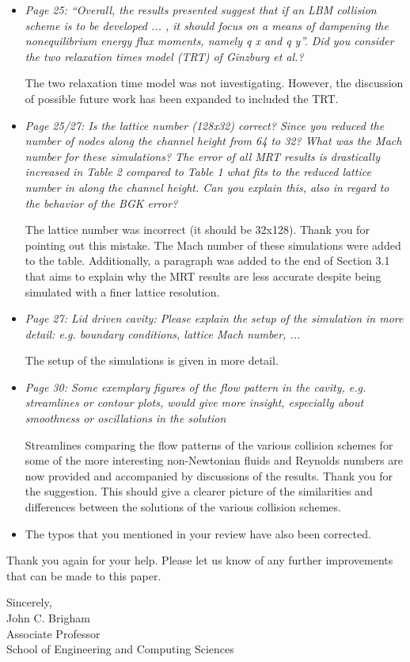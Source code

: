 \documentclass{article}
\begin{document}
\begin{itemize}
	\item \emph{Page 25: ``Overall, the results presented suggest that if an LBM collision scheme is to
		be developed ... , it should focus on a means of dampening the nonequilibrium
		energy flux moments, namely q x and q y''. Did you consider the two relaxation times
		model (TRT) of Ginzburg et al.?}
	
	The two relaxation time model was not investigating. However, the discussion of possible future work has been expanded to included the TRT.
	
	\item \emph{Page 25/27: Is the lattice number (128x32) correct? Since you reduced the number
		of nodes along the channel height from 64 to 32? What was the Mach number for
		these simulations? The error of all MRT results is drastically increased in Table 2
		compared to Table 1 what fits to the reduced lattice number in along the channel
		height. Can you explain this, also in regard to the behavior of the BGK error?}
	
	The lattice number was incorrect (it should be 32x128).
	Thank you for pointing out this mistake.
	The Mach number of these simulations were added to the table.
	Additionally, a paragraph was added to the end of Section 3.1 that aims to explain why the MRT results are less accurate despite being simulated with a finer lattice resolution.
	
	\item \emph{Page 27: Lid driven cavity: Please explain the setup of the simulation in more detail:
		e.g. boundary conditions, lattice Mach number, ...}
	
	The setup of the simulations is given in more detail.
	
	\item \emph{Page 30: Some exemplary figures of the flow pattern in the cavity, e.g. streamlines or
		contour plots, would give more insight, especially about smoothness or oscillations in
		the solution}
	
	Streamlines comparing the flow patterns of the various collision schemes for some of the more interesting non-Newtonian fluids and Reynolds numbers are now provided and accompanied by discussions of the results.
	Thank you for the suggestion.
	This should give a clearer picture of the similarities and differences between the solutions of the various collision schemes.
	
	\item The typos that you mentioned in your review have also been corrected.
	
	\end{itemize}

Thank you again for your help. Please let us know of any further improvements that can be made to this paper.

\vspace{1in}
\noindent Sincerely, \\
\indent John C. Brigham \vspace{0.1in}\\
\indent Associate Professor \\
\indent School of Engineering and Computing Sciences
	
\end{document}
